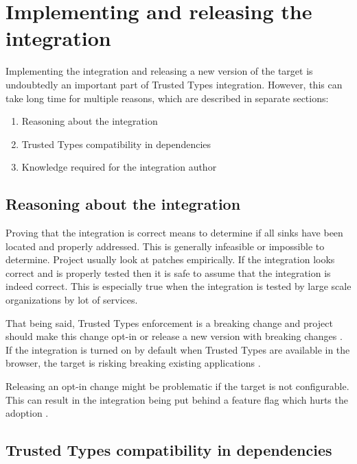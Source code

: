 \section{Implementing and releasing the integration}

Implementing the integration and releasing a new version of the target is undoubtedly an important part
of Trusted Types integration. However, this can take long time for multiple reasons, which are
described in separate sections:

\begin{enumerate}
  \item Reasoning about the integration
  \item Trusted Types compatibility in dependencies
  \item Knowledge required for the integration author
\end{enumerate}

\subsection{Reasoning about the integration}
\label{sub:reason_about_integration}

Proving that the integration is correct means to determine if all sinks have been located and
properly addressed. This is generally infeasible or impossible to determine. Project usually look at
patches empirically. If the integration looks correct and is properly tested then it is safe to
assume that the integration is indeed correct. This is especially true when the integration is
tested by large scale organizations by lot of services.

That being said, Trusted Types enforcement is a breaking change and project should make this change
opt-in or release a new version with breaking changes \cite{dom_purify_major_version}. If the
integration is turned on by default when Trusted Types are available in the browser, the target is
risking breaking existing applications \cite{dom_purify_breakage}.

Releasing an opt-in change might be problematic if the target is not configurable. This can result
in the integration being put behind a feature flag which hurts the adoption
\cite{react_tt_feature_flag}.

\subsection{Trusted Types compatibility in dependencies}
\label{sub:tt_compatibility_in_deps}

